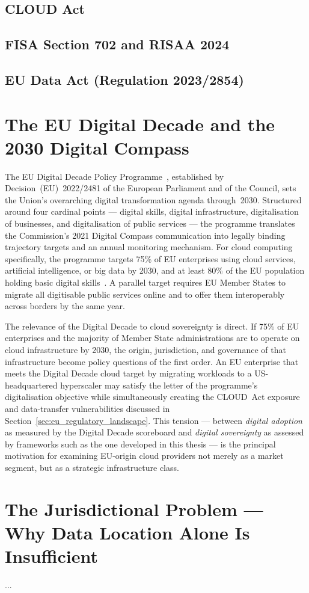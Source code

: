 \subsection{CLOUD Act}
\subsection{FISA Section 702 and RISAA 2024}
\subsection{EU Data Act (Regulation 2023/2854)}

\section{The EU Digital Decade and the 2030 Digital Compass}
\label{sec:digital_decade}

The EU Digital Decade Policy Programme~\cite{EC_DigitalDecade_2022}, established by Decision~(EU)~2022/2481 of the European Parliament and of the Council, sets the Union's overarching digital transformation agenda through~2030. Structured around four cardinal points --- digital skills, digital infrastructure, digitalisation of businesses, and digitalisation of public services --- the programme translates the Commission's 2021 Digital Compass communication into legally binding trajectory targets and an annual monitoring mechanism. For cloud computing specifically, the programme targets 75\% of EU enterprises using cloud services, artificial intelligence, or big data by 2030, and at least 80\% of the EU population holding basic digital skills~\cite{EC_DigitalDecade_2022}. A parallel target requires EU Member States to migrate all digitisable public services online and to offer them interoperably across borders by the same year.

The relevance of the Digital Decade to cloud sovereignty is direct. If 75\% of EU enterprises and the majority of Member State administrations are to operate on cloud infrastructure by 2030, the origin, jurisdiction, and governance of that infrastructure become policy questions of the first order. An EU enterprise that meets the Digital Decade cloud target by migrating workloads to a US-headquartered hyperscaler may satisfy the letter of the programme's digitalisation objective while simultaneously creating the CLOUD~Act exposure and data-transfer vulnerabilities discussed in Section~\ref{sec:eu_regulatory_landscape}. This tension --- between \emph{digital adoption} as measured by the Digital Decade scoreboard and \emph{digital sovereignty} as assessed by frameworks such as the one developed in this thesis --- is the principal motivation for examining EU-origin cloud providers not merely as a market segment, but as a strategic infrastructure class.

\section{The Jurisdictional Problem — Why Data Location Alone Is Insufficient}
...